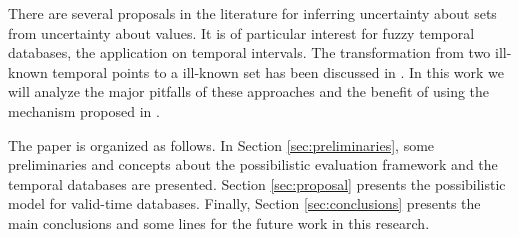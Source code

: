 

There are several proposals in the literature for inferring uncertainty about sets from uncertainty about values. It is of particular interest for fuzzy temporal databases, the application on temporal intervals. The transformation from two ill-known temporal points to a ill-known set has been discussed in \cite{Garrido2009}. In this work we will analyze the major pitfalls of these approaches and the benefit of using the mechanism proposed in \cite{Pon11}.

The paper is organized as follows. In Section \ref{sec:preliminaries}, some preliminaries and concepts about the possibilistic evaluation framework and the temporal databases are presented. 
Section \ref{sec:proposal} presents the possibilistic model for valid-time databases.
Finally, Section \ref{sec:conclusions} presents the main conclusions and some lines for the future work in this research.